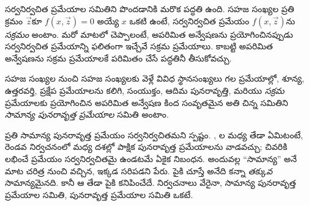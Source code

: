 \documentclass[../../../include/open-logic-section]{subfiles}
\begin{document}

సర్వనిర్వచిత ప్రమేయాల సమితిని పొందడానికి మరొక పద్ధతి ఉంది. సహజ
సంఖ్యల ప్రతి క్రమం $\vec z$కూ $f(x,\vec z)=0$ అయ్యే $x$ ఒకటి ఉంటే,
సర్వనిర్వచిత ప్రమేయం $f(x,\vec z)$ను \emph{సక్రమం} అంటాం. మరో
మాటలో చెప్పాలంటే, అపరిమిత అన్వేషణను ప్రయోగించినప్పుడు సర్వనిర్వచిత
ప్రమేయాన్ని ఫలితంగా ఇచ్చేవే సక్రమ ప్రమేయాలు. కాబట్టి అపరిమిత అన్వేషణను సక్రమ
ప్రమేయాలకే పరిమితం చేసే పద్ధతినీ తీసుకోవచ్చు.

\begin{defn}
సహజ సంఖ్యల నుంచి సహజ సంఖ్యలకు వెళ్లే వివిధ స్థానసంఖ్యలు గల ప్రమేయాల్లో,
శూన్య, ఉత్తరవర్తి, ప్రక్షేప ప్రమేయాలను కలిగి, సంయుక్తం, ఆదిమ పునరావృత్తి,
మరియు \emph{సక్రమ} ప్రమేయాలకు ప్రయోగించిన అపరిమిత అన్వేషణ కింద
సంవృతమైన అతి చిన్న సమితిని \emph{సామాన్య పునరావృత్త ప్రమేయాల}
సమితి అంటాం.
\end{defn}

ప్రతి సామాన్య పునరావృత్త ప్రమేయం సర్వనిర్వచితమని స్పష్టం.
, ల మధ్య
తేడా ఏమిటంటే, రెండవ నిర్వచనంలో మధ్య దశల్లో పాక్షిక పునరావృత్త
ప్రమేయాలను వాడవచ్చు; చివరికి లభించే ప్రమేయం సర్వనిర్వచితమై ఉండటమే
ఏకైక నిబంధన. అందువల్ల ``సామాన్య'' అనే మాట చరిత్ర నుంచి వచ్చిన, ఇక్కడ సరిపడని
పేరు. పైకి చూస్తే  అనేది
కన్నా \emph{తక్కువ} సామాన్యమైనది.
కానీ ఆ తేడా పైకి కనిపించేదే. నిర్వచనాలు వేరైనా, సామాన్య
పునరావృత్త ప్రమేయాల సమితి, పునరావృత్త ప్రమేయాల సమితి ఒకటే.
\end{document}
